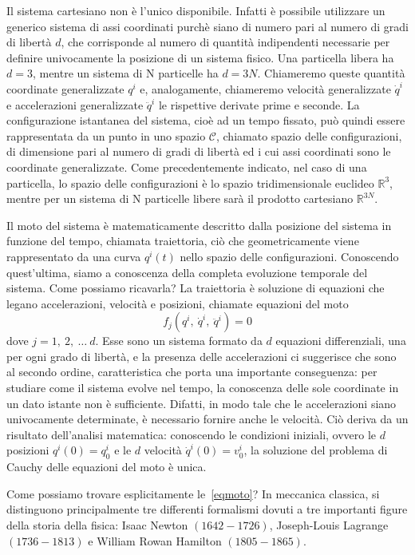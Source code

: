     Il sistema cartesiano non è l'unico disponibile. Infatti è possibile utilizzare un generico sistema di assi coordinati purchè siano di numero pari al numero di gradi di libertà $d$, che corrisponde al numero di quantità indipendenti necessarie per definire univocamente la posizione di un sistema fisico. Una particella libera ha $d = 3$, mentre un sistema di N particelle ha $d = 3N$. Chiameremo queste quantità coordinate generalizzate $q^i$ e, analogamente, chiameremo velocità generalizzate $\dot q^i$ e accelerazioni generalizzate $\ddot q^i$ le rispettive derivate prime e seconde. La configurazione istantanea del sistema, cioè ad un tempo fissato, può quindi essere rappresentata da un punto in uno spazio $\mathcal C$, chiamato spazio delle configurazioni, di dimensione pari al numero di gradi di libertà ed i cui assi coordinati sono le coordinate generalizzate. Come precedentemente indicato, nel caso di una particella, lo spazio delle configurazioni è lo spazio tridimensionale euclideo $\mathbb R^3$, mentre per un sistema di N particelle libere sarà il prodotto cartesiano $\mathbb R^{3N}$.
    
    Il moto del sistema è matematicamente descritto dalla posizione del sistema in funzione del tempo, chiamata traiettoria, ciò che geometricamente viene rappresentato da una curva $q^i(t)$ nello spazio delle configurazioni. Conoscendo quest'ultima, siamo a conoscenza della completa evoluzione temporale del sistema. Come possiamo ricavarla? La traiettoria è soluzione di equazioni che legano accelerazioni, velocità e posizioni, chiamate equazioni del moto
    \begin{equation} \label{eqmoto}
        f_j(q^i, ~ \dot q^i, ~ \ddot q^i) = 0
    \end{equation}
    dove $j = 1, ~2, ~\ldots ~d$. Esse sono un sistema formato da $d$ equazioni differenziali, una per ogni grado di libertà, e la presenza delle accelerazioni ci suggerisce che sono al secondo ordine, caratteristica che porta una importante conseguenza: per studiare come il sistema evolve nel tempo, la conoscenza delle sole coordinate in un dato istante non è sufficiente. Difatti, in modo tale che le accelerazioni siano univocamente determinate, è necessario fornire anche le velocità. Ciò deriva da un risultato dell'analisi matematica: conoscendo le condizioni iniziali, ovvero le $d$ posizioni $q^i(0) = q^i_0$ e le $d$ velocità $\dot q^i(0) = v^i_0$, la soluzione del problema di Cauchy delle equazioni del moto è unica. 
    
    Come possiamo trovare esplicitamente le~\eqref{eqmoto}? In meccanica classica, si distinguono principalmente tre differenti formalismi dovuti a tre importanti figure della storia della fisica: Isaac Newton $(1642-1726)$, Joseph-Louis Lagrange $(1736-1813)$ e William Rowan Hamilton $(1805-1865)$. 

